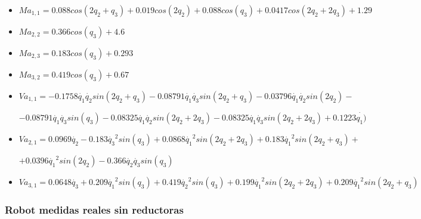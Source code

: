 \begin{itemize}

	\item $ Ma_{1,1}=0.088cos(2q_2 + q_3) + 0.019cos(2q_2) + 0.088cos(q_3) + 0.0417cos(2q_{2} + 2q_{3}) + 1.29$ \\ \vspace{0.2cm}

	\item $ Ma_{2,2}= 0.366cos(q_3) + 4.6$ \\ \vspace{0.2cm}

	\item $ Ma_{2,3}=0.183cos(q_3) + 0.293$ \\ \vspace{0.2cm}

	\item $ Ma_{3,2}=  0.419cos(q_3) + 0.67$ \\ \vspace{0.2cm}

	\item $ Va_{1,1}=-0.1758\dot{q_1}\dot{q_2}sin(2q_2 + q_3) - 0.08791\dot{q_1}\dot{q_3}sin(2q_2 + q_3) - 0.03796\dot{q_1}\dot{q_2}sin(2q_2) -$ \\ \vspace{0.1cm}

	$ - 0.08791\dot{q_1}\dot{q_3}sin(q_3) - 0.08325\dot{q_1}\dot{q_2}sin(2q_2 + 2q_3) - 0.08325\dot{q_1}\dot{q_3}sin(2q_2 + 2q_3) + 0.1223\dot{q_1)}$ \\ \vspace{0.2cm}

	\item $ Va_{2,1}=0.0969\dot{q_2} - 0.183\dot{q_3}^{2}sin(q_3) + 0.0868\dot{q_1}^{2}sin(2q_{2} + 2q_{3}) + 0.183\dot{q_1}^{2}sin(2q_2 + q_3) + $ \\ \vspace{0.1cm}

	$ + 0.0396\dot{q_1}^{2}sin(2q_{2}) - 0.366\dot{q_2}\dot{q_3}sin(q_3) $\\ \vspace{0.2cm}

	\item $ Va_{3,1}=0.0648\dot{q_3} + 0.209\dot{q_1}^{2}sin(q_3) + 0.419\dot{q_2}^{2}sin(q_3) + 0.199\dot{q_1}^{2}sin(2q_2 + 2q_3) + 0.209\dot{q_1}^{2}sin(2q_2 + q_3) $

\end{itemize}


\subsubsection{Robot medidas reales sin reductoras}

